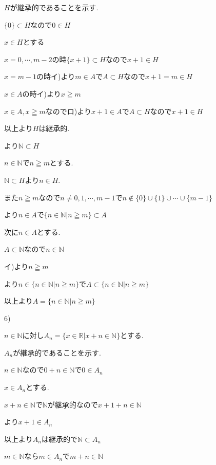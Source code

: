 \documentclass{jsarticle}
\begin{document}
       $H$が継承的であることを示す.
       
       $\{0\}\subset H$なので$0\in H$
       
       $x\in H$とする
       
       $x = 0,\cdots , m-2$の時$\{x+1\}\subset H$なので$x+1\in H$
       
       $x = m-1$の時イ)より$m\in A$で$A\subset H$なので$x+1=m\in H$
       
       $x\in A$の時イ)より$x\geqq m$
       
       $x\in A,x\geqq m$なのでロ)より$x+1\in A$で$A\subset H$なので$x+1\in H$
       
       以上より$H$は継承的.
       
       より$\mathbb{N}\subset H$
       
       $n\in \mathbb{N}$で$n\geqq m$とする.
       
       $\mathbb{N}\subset H$より$n\in H$.
       
       また$n\geqq m$なので$n \neq 0,1,\cdots , m-1$で$n\notin  \{0\} \cup \{1\} \cup \cdots \cup \{m-1\}$
       
       より$n\in A$で$\{n\in \mathbb{N}|n\geqq m\}\subset A$
       
       次に$n\in A$とする.
       
       $A\subset \mathbb{N}$なので$n\in\mathbb{N}$
       
       イ)より$n\geqq m$
       
       より$n\in \{n\in \mathbb{N}|n\geqq m\}$で$A\subset \{n\in \mathbb{N}|n\geqq m\}$
       
       以上より$A=\{n\in \mathbb{N}|n\geqq m\}$
       
       6)
       
       $n\in \mathbb{N}$に対し$A_n=\{x\in \mathbb{R}|x+n\in\mathbb{N}\}$とする.
       
       $A_n$が継承的であることを示す.
       
       $n\in \mathbb{N}$なので$0+n\in \mathbb{N}$で$0\in A_n$
       
       $x\in A_n$とする.
       
       $x+n\in \mathbb{N}$で$\mathbb{N}$が継承的なので$x+1+n\in \mathbb{N}$
       
       より$x+1\in A_n$
       
       以上より$A_n$は継承的で$\mathbb{N} \subset A_n$
       
       $m\in \mathbb{N}$なら$m\in A_n$で$m+n\in\mathbb{N}$
       
\end{document}
